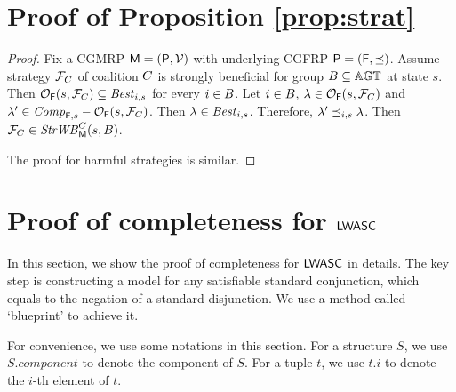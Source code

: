 
\appendix

\allowdisplaybreaks

\section{Proof of Proposition \ref{prop:strat}}\label{sec: Proof of Proposition 1}\label{sec:app:prop_strat}
\begin{proof}
    Fix a CGMRP 
    $\mathsf{M} = (\mathsf{P}, \mathcal{V})$  with underlying CGFRP $\mathsf{P} = (\mathsf{F}, \preceq)$. Assume strategy $\mathcal{F}_C$ of coalition $C$ is strongly beneficial for group $B\subseteq \mathbb{AGT}$ at state $s$. Then $\mathcal{O}_{\mathsf{F}}(s,\mathcal{F}_C)\subseteq \mathit{Best}_{i,s}$ for every $i\in B $. Let $i\in B$, $\lambda\in \mathcal{O}_{\mathsf{F}}(s,\mathcal{F}_C)$ and $\lambda'\in \mathit{Comp}_{\mathsf{F},s}-\mathcal{O}_{\mathsf{F}}(s,\mathcal{F}_C)$. Then $\lambda\in \mathit{Best}_{i,s}$. Therefore, $\lambda' \preceq_{i,s} \lambda$. Then $\mathcal{F}_C\in \mathit{StrWB}_{\mathsf{M} }^C(s,B)$.

    The proof for harmful strategies is similar.
  \end{proof}
  
\section{Proof of completeness for $\mathsf{LWASC}$}\label{sec: proof of completeness for SCA-CL}\label{sec:app:completeness}
In this section, we show the proof of completeness for $\mathsf{LWASC}$ in details. The key step is constructing a model for any satisfiable standard conjunction, which equals to the negation of a standard disjunction. We use a method called `blueprint' to achieve it.

For convenience, we use some notations in this section. For a structure $S$, we use $S.component$ to denote the component of $S$. For a tuple $t$, we use $t.i$ to denote the $i$-th element of $t$. 

